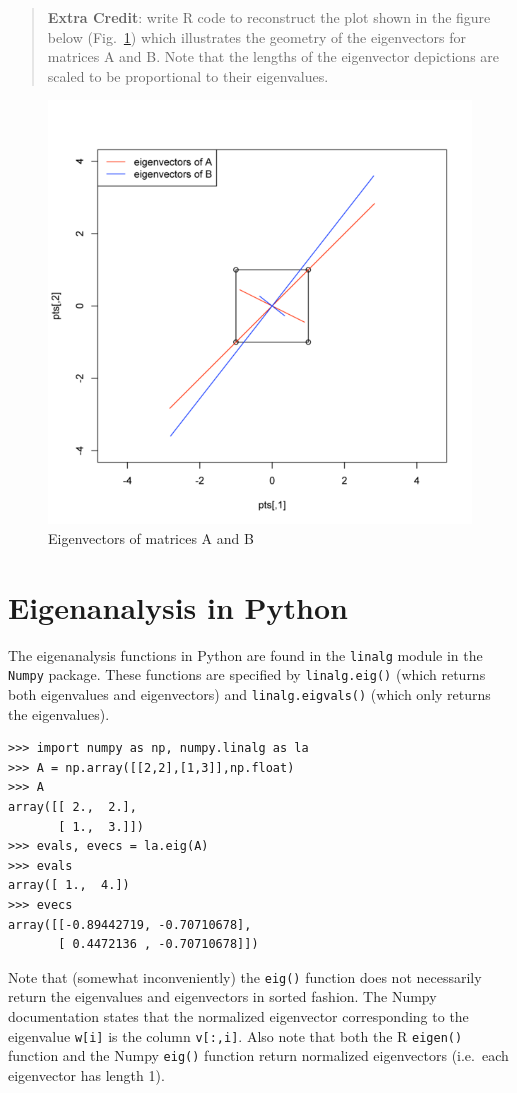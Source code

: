 \begin{quote}
\textbf{Extra Credit}: write R code to reconstruct the plot shown in the
figure below (Fig.~\ref{fig:eigen}) which illustrates the geometry of the eigenvectors for
matrices A and B. Note that the lengths of the eigenvector depictions
are scaled to be proportional to their eigenvalues.

\end{quote}
\begin{figure}[htbp]
\centering
\includegraphics{eigen-ECplot.png}
\caption{Eigenvectors of matrices A and B \label{fig:eigen}}
\end{figure}

\section{Eigenanalysis in Python}

The eigenanalysis functions in Python are found in the
\lstinline!linalg! module in the \lstinline!Numpy! package. These
functions are specified by \lstinline!linalg.eig()! (which returns both
eigenvalues and eigenvectors) and \lstinline!linalg.eigvals()! (which
only returns the eigenvalues).

\begin{lstlisting}
>>> import numpy as np, numpy.linalg as la
>>> A = np.array([[2,2],[1,3]],np.float)
>>> A
array([[ 2.,  2.],
       [ 1.,  3.]])
>>> evals, evecs = la.eig(A)
>>> evals
array([ 1.,  4.])
>>> evecs
array([[-0.89442719, -0.70710678],
       [ 0.4472136 , -0.70710678]])
\end{lstlisting}
Note that (somewhat inconveniently) the \lstinline!eig()! function does
not necessarily return the eigenvalues and eigenvectors in sorted
fashion. The Numpy documentation states that the normalized eigenvector
corresponding to the eigenvalue \lstinline!w[i]! is the column
\lstinline!v[:,i]!. Also note that both the R \lstinline!eigen()!
function and the Numpy \lstinline!eig()! function return normalized
eigenvectors (i.e.~each eigenvector has length 1).


